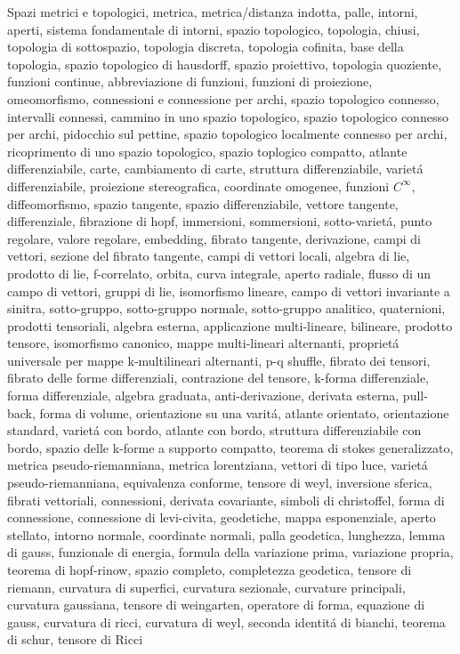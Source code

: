 \begin{multicols}{3}
  Spazi metrici e topologici,
  metrica,
  metrica/distanza indotta,
  palle,
  intorni,
  aperti,
  sistema fondamentale di intorni,
  spazio topologico,
  topologia,
  chiusi,
  topologia di sottospazio,
  topologia discreta,
  topologia cofinita,
  base della topologia,
  spazio topologico di hausdorff,
  spazio proiettivo,
  topologia quoziente,
  funzioni continue,
  abbreviazione di funzioni,
  funzioni di proiezione,
  omeomorfismo,
  connessioni e connessione per archi,
  spazio topologico connesso,
  intervalli connessi,
  cammino in uno spazio topologico,
  spazio topologico connesso per archi,
  pidocchio sul pettine,
  spazio topologico localmente connesso per archi,
  ricoprimento di uno spazio topologico,
  spazio toplogico compatto,
  atlante differenziabile,
  carte,
  cambiamento di carte,
  struttura differenziabile,
  variet\'a differenziabile,
  proiezione stereografica,
  coordinate omogenee,
  funzioni $C^\infty$,
  diffeomorfismo,
  spazio tangente,
  spazio differenziabile,
  vettore tangente,
  differenziale,
  fibrazione di hopf,
  immersioni,
  sommersioni,
  sotto-variet\'a,
  punto regolare,
  valore regolare,
  embedding,
  fibrato tangente,
  derivazione,
  campi di vettori,
  sezione del fibrato tangente,
  campi di vettori locali,
  algebra di lie,
  prodotto di lie,
  f-correlato,
  orbita,
  curva integrale,
  aperto radiale,
  flusso di un campo di vettori,
  gruppi di lie,
  isomorfismo lineare,
  campo di vettori invariante a sinitra,
  sotto-gruppo,
  sotto-gruppo normale,
  sotto-gruppo analitico,
  quaternioni,
  prodotti tensoriali,
  algebra esterna,
  applicazione multi-lineare,
  bilineare,
  prodotto tensore,
  isomorfismo canonico,
  mappe multi-lineari alternanti,
  propriet\'a universale per mappe k-multilineari alternanti,
  p-q shuffle,
  fibrato dei tensori,
  fibrato delle forme differenziali,
  contrazione del tensore,
  k-forma differenziale,
  forma differenziale,
  algebra graduata,
  anti-derivazione,
  derivata esterna,
  pull-back,
  forma di volume,
  orientazione su una varit\'a,
  atlante orientato,
  orientazione standard,
  variet\'a con bordo,
  atlante con bordo,
  struttura differenziabile con bordo,
  spazio delle k-forme a supporto compatto,
  teorema di stokes generalizzato,
  metrica pseudo-riemanniana,
  metrica lorentziana,
  vettori di tipo luce,
  variet\'a pseudo-riemanniana,
  equivalenza conforme,
  tensore di weyl,
  inversione sferica,
  fibrati vettoriali,
  connessioni,
  derivata covariante,
  simboli di christoffel,
  forma di connessione,
  connessione di levi-civita,
  geodetiche,
  mappa esponenziale,
  aperto stellato,
  intorno normale,
  coordinate normali,
  palla geodetica,
  lunghezza,
  lemma di gauss,
  funzionale di energia,
  formula della variazione prima,
  variazione propria,
  teorema di hopf-rinow,
  spazio completo,
  completezza geodetica,
  tensore di riemann,
  curvatura di superfici,
  curvatura sezionale,
  curvature principali,
  curvatura gaussiana,
  tensore di weingarten,
  operatore di forma,
  equazione di gauss,
  curvatura di ricci,
  curvatura di weyl,
  seconda identit\'a di bianchi,
  teorema di schur,
  tensore di Ricci
\end{multicols}

